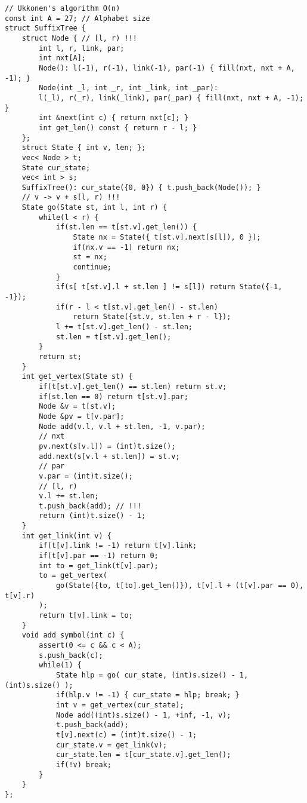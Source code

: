 \documentclass[12pt]{article}
\newcommand{\BeginConspect}{
  \pagestyle{fancy}
}
\begin{document}
\renewcommand{\dateseparator}{--}

\BeginConspect

\pagebreak

\begin{verbatim}
// Ukkonen's algorithm O(n)
const int A = 27; // Alphabet size
struct SuffixTree {
    struct Node { // [l, r) !!!
        int l, r, link, par;
        int nxt[A];
        Node(): l(-1), r(-1), link(-1), par(-1) { fill(nxt, nxt + A, -1); }
        Node(int _l, int _r, int _link, int _par): 
        l(_l), r(_r), link(_link), par(_par) { fill(nxt, nxt + A, -1); }
        int &next(int c) { return nxt[c]; }
        int get_len() const { return r - l; }
    };
    struct State { int v, len; };
    vec< Node > t;
    State cur_state;
    vec< int > s;
    SuffixTree(): cur_state({0, 0}) { t.push_back(Node()); }
    // v -> v + s[l, r) !!!
    State go(State st, int l, int r) {
        while(l < r) {
            if(st.len == t[st.v].get_len()) {
                State nx = State({ t[st.v].next(s[l]), 0 });
                if(nx.v == -1) return nx;
                st = nx;
                continue;
            }
            if(s[ t[st.v].l + st.len ] != s[l]) return State({-1, -1});
            if(r - l < t[st.v].get_len() - st.len) 
                return State({st.v, st.len + r - l});
            l += t[st.v].get_len() - st.len;
            st.len = t[st.v].get_len();
        }
        return st;
    }
    int get_vertex(State st) {
        if(t[st.v].get_len() == st.len) return st.v;
        if(st.len == 0) return t[st.v].par;
        Node &v = t[st.v];
        Node &pv = t[v.par];
        Node add(v.l, v.l + st.len, -1, v.par);
        // nxt
        pv.next(s[v.l]) = (int)t.size();
        add.next(s[v.l + st.len]) = st.v;
        // par
        v.par = (int)t.size();
        // [l, r)
        v.l += st.len;
        t.push_back(add); // !!!
        return (int)t.size() - 1;
    }
    int get_link(int v) {
        if(t[v].link != -1) return t[v].link;
        if(t[v].par == -1) return 0;
        int to = get_link(t[v].par);
        to = get_vertex(
            go(State({to, t[to].get_len()}), t[v].l + (t[v].par == 0), t[v].r)
        );
        return t[v].link = to;
    }
    void add_symbol(int c) {
        assert(0 <= c && c < A);
        s.push_back(c);
        while(1) {
            State hlp = go( cur_state, (int)s.size() - 1, (int)s.size() );
            if(hlp.v != -1) { cur_state = hlp; break; }
            int v = get_vertex(cur_state);
            Node add((int)s.size() - 1, +inf, -1, v);
            t.push_back(add);
            t[v].next(c) = (int)t.size() - 1;
            cur_state.v = get_link(v);
            cur_state.len = t[cur_state.v].get_len();
            if(!v) break;
        }
    }
};
\end{verbatim}
\end{document}

